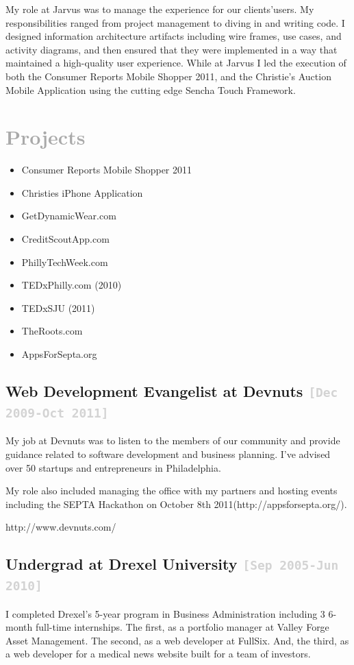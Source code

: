 \documentclass{tufte-handout}
\newcommand{\mhstandout}[1]{\textbf{\textcolor{DarkGray}{#1}}}
\newcommand{\shstandout}[1]{\textbf{\textcolor{BurntOrange}{#1}}}
\newcommand{\shyears}[1]{\small{\texttt{\textcolor{LightGray}{#1}}}}
\begin{document}
My role at Jarvus was to manage the experience for our clients'​ users. My responsibilities ranged from project management to diving in and writing code. I designed information architecture artifacts including wire frames, use cases, and activity diagrams, and then ensured that they were implemented in a way that maintained a high-quality user experience.
While at Jarvus I led the execution of both the Consumer Reports Mobile Shopper 2011, and the Christie's Auction Mobile Application using the cutting edge Sencha Touch Framework.

\section{\mhstandout{Projects}}
\begin{itemize}
\itemsep-0.1em
\item{Consumer Reports Mobile Shopper 2011}
\item{Christies iPhone Application}
\item{GetDynamicWear.com}
\item{CreditScoutApp.com}
\item{PhillyTechWeek.com}
\item{TEDxPhilly.com (2010)}
\item{TEDxSJU (2011)}
\item{TheRoots.com}
\item{AppsForSepta.org}
\end{itemize}
\smallskip

\subsection{\textbf{Web Development Evangelist} at \shstandout{Devnuts} \shyears{[Dec 2009-Oct 2011]}}

My job at Devnuts was to listen to the members of our community and provide guidance related to software development and business planning. I've advised over 50 startups and entrepreneurs in Philadelphia.

My role also included managing the office with my partners and hosting events including the SEPTA Hackathon on October 8th 2011(http://appsforsepta.org/).

http://www.devnuts.com/


\subsection{\textbf{Undergrad} at \shstandout{Drexel University} \shyears{[Sep 2005-Jun 2010]}}
I completed Drexel's 5-year program in Business Administration including 3 6-month full-time internships. The first, as a portfolio manager at Valley Forge Asset Management. The second, as a web developer at FullSix. And, the third, as a web developer for a medical news website built for a team of investors.
\end{document}
